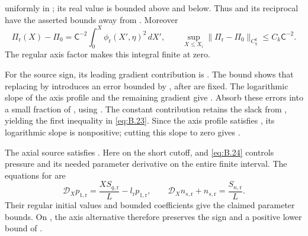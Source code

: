 %
uniformly in ; its real value is bounded above and below. Thus
 and its reciprocal have the asserted bounds away from
. Moreover
\begin{equation}
  \Pi_{\mathrm r}(X)-\Pi_0=\mathsf C^{-2}\int_0^X\phi_{\mathrm r}(X',\eta)^2\,dX',
  \qquad
  \sup_{X\leq X_i}\lVert\Pi_{\mathrm r}-\Pi_0\rVert_{C_\eta^k}\leq C_k\mathsf C^{-2}.
\tag{B.24}\label{eq:B.24}
\end{equation}
The regular axis factor makes this integral finite at zero.

For the source sign, its leading gradient contribution is
. The bound
 shows that replacing
 by  introduces an error bounded by
, after
 are fixed. The logarithmic slope of the axis profile and the remaining gradient give
. Absorb these errors into a small fraction of
, using
.
The constant contribution retains the slack from , yielding the first inequality
in \eqref{eq:B.23}. Since the axis profile satisfies , its logarithmic
 slope is nonpositive; cutting this slope to zero gives
.

The axial source satisfies
. Here
 on the short cutoff, and \eqref{eq:B.24}
controls pressure and its needed parameter derivative on the entire finite interval. The equations for
 are
\begin{equation}
  \mathcal D_Xp_{1,\mathrm r}=\frac{XS_{q,\mathrm r}}{L}-l_{\mathrm r}p_{1,\mathrm r},
  \qquad
  \mathcal D_Xn_{s,\mathrm r}+n_{s,\mathrm r}=\frac{S_{n,\mathrm r}}{L}.
\tag{B.25}\label{eq:B.25}
\end{equation}
Their regular initial values and bounded coefficients give the claimed parameter bounds. On
, the axis alternative
 therefore preserves the sign and a positive lower bound of
.

